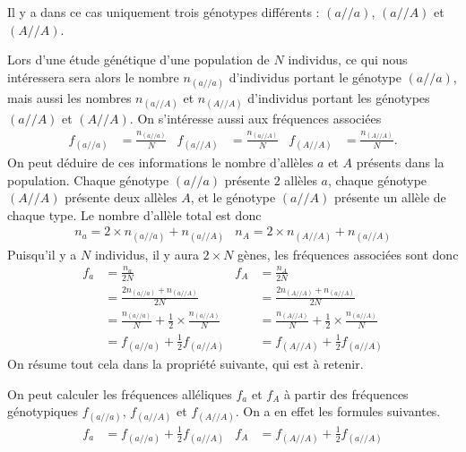 \documentclass[11pt]{article}
\begin{document}
\begin{prop}
  Il y a dans ce cas uniquement trois génotypes différents : $\left( a//a
  \right)$, $(a//A)$ et $(A//A)$.
\end{prop}
Lors d'une étude génétique d'une population de $N$ individus, ce qui nous
intéressera sera alors le nombre $n_{(a//a)}$ d'individus portant le génotype
$(a//a)$, mais aussi les nombres $n_{(a//A)}$ et $n_{(A//A)}$ d'individus
portant les génotypes $(a//A)$ et $(A//A)$. On s'intéresse aussi aux fréquences
associées
\begin{align*}
  f_{(a//a)} &= \frac{n_{(a//a)}}{N} &
  f_{(a//A)} &= \frac{n_{(a//A)}}{N} &
  f_{(A//A)} &= \frac{n_{(A//A)}}{N}.
\end{align*}
On peut déduire de ces informations le nombre d'allèles $a$ et $A$ présents dans
la population. Chaque
génotype $(a//a)$ présente $2$ allèles $a$, chaque génotype $(A//A)$ présente
deux allèles $A$, et le génotype $(a//A)$ présente un allèle de chaque type. Le
nombre d'allèle total est donc
\begin{align*}
  n_a = 2\times n_{(a//a)}+n_{(a//A)} &
  n_A = 2\times n_{(A//A)}+n_{(a//A)}
\end{align*}
Puisqu'il y a $N$ individus, il y aura $2\times N$ gènes, les fréquences
associées sont donc
\begin{align*}
  f_{a} &= \frac{n_a}{2N} & 
  f_{A} &= \frac{n_A}{2N} \\
  &= \frac{2n_{(a//a)}+n_{(a//A)}}{2N} &
  &= \frac{2n_{(A//A)}+n_{(a//A)}}{2N} \\
  &= \frac{n_{(a//a)}}{N}+\frac{1}{2}\times\frac{n_{(a//A)}}{N} &
  &= \frac{n_{(A//A)}}{N}+\frac{1}{2}\times\frac{n_{(a//A)}}{N} \\
  &= f_{(a//a)}+\frac{1}{2}f_{(a//A)} &
  &= f_{(A//A)}+\frac{1}{2}f_{(a//A)}
\end{align*}
On résume tout cela dans la propriété suivante, qui est à retenir.
\begin{prop}
  On peut calculer les fréquences alléliques $f_a$ et $f_A$ à partir des fréquences
  génotypiques $f_{(a//a)}$, $f_{(a//A)}$ et $f_{(A//A)}$. On a en effet les
  formules suivantes.
  \begin{align*}
    f_a &= f_{(a//a)}+\frac{1}{2}f_{(a//A)} &
    f_A &= f_{(A//A)}+\frac{1}{2}f_{(a//A)}
  \end{align*}
\end{prop}
\end{document}
